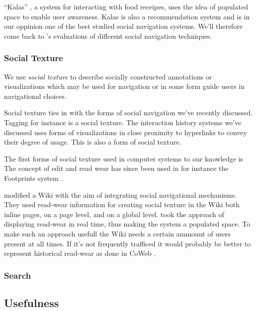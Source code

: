 ``Kalas'' \citep{svensson05}, a system for interacting with food receipes,
uses the idea of populated space to enable user awareness. Kalas is also a
recommendation system and is in our oppinion one of the best studied social
navigation systems. We'll therefore come back to \citeauthor{svensson05}'s
evaluations of different social navigation techniques.

\subsubsection{Social Texture}

We use \emph{social texture} to describe socially constructed annotations or
visualizations which may be used for navigation or in some form guide
users in navigational choices.

Social texture ties in with the forms of social navigation we've
recently discussed. Tagging for instance is a social texture.
The interaction history systems we've discussed uses forms of visualizations
in close proximity to hyperlinks to convey their degree of usage. This is also
a form of social texture.

The first forms of social texture used in computer systems to our knowledge is
The concept of edit and read wear has since been used in for instance the
Footprints system \citep{wexelblat99}.

\citet{xu06} modified a Wiki with the aim of integrating social navigational
mechanisms. They used read-wear information for creating social
texture in the Wiki both inline pages, on a page level, and on a global
level. \citeauthor{xu06} took the approach of displaying read-wear in real
time, thus making the system a populated space. To make such an approach
usefull the Wiki needs a certain ammount of users present at all times. If
it's not frequently trafficed it would probably be better to represent
historical read-wear as done in CoWeb \citep[p.~220]{dieberger00a}.

\subsubsection{Search}

\subsection{Usefulness}

